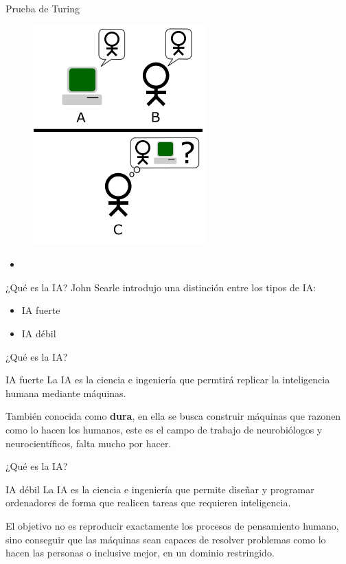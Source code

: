 \documentclass[11pt,aspectratio=169]{beamer}
\begin{document}
\begin{frame}{Prueba de Turing}
    \begin{figure}
        \centering
        \includegraphics[scale=0.75]{img/Turing_Test_version_3.png}
    \end{figure}
    \begin{itemize}
        \item 
    \end{itemize}
\end{frame}

\begin{frame}{¿Qué es la IA?}
    John Searle introdujo una distinción entre los tipos de IA\pause \cite{searle}:
    \begin{itemize}
        \item IA fuerte \pause
        \item IA débil
    \end{itemize}
\end{frame}

\begin{frame}{¿Qué es la IA?}
    \begin{block}{IA fuerte}\pause
        La IA es la ciencia e ingeniería que permtirá replicar la inteligencia
        humana mediante máquinas.
    \end{block}\pause
    También conocida como \textbf{dura}, en ella se busca construir máquinas que
    razonen como lo hacen los humanos, este es el campo de trabajo de neurobiólogos
    y neurocientíficos, falta mucho por hacer.
\end{frame}

\begin{frame}{¿Qué es la IA?}
    \begin{block}{IA débil}\pause
        La IA es la ciencia e ingeniería que permite diseñar y programar
        ordenadores de forma que realicen tareas que requieren inteligencia.
    \end{block}\pause
    El objetivo no es reproducir exactamente los procesos de pensamiento humano,
    sino conseguir que las máquinas sean capaces de resolver problemas como lo 
    hacen las personas o inclusive mejor, en un dominio restringido.
\end{frame}
\end{document}
